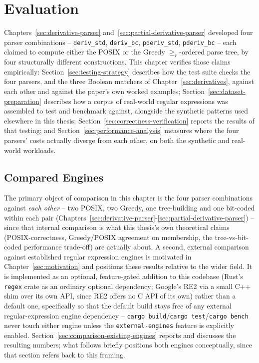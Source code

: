 \chapter{Evaluation}
\label{sec:evaluation}

Chapters~\ref{sec:derivative-parser} and~\ref{sec:partial-derivative-parser}
developed four parser combinations -- \texttt{deriv\_std},
\texttt{deriv\_bc}, \texttt{pderiv\_std}, \texttt{pderiv\_bc} -- each
claimed to compute either the POSIX or the Greedy $\geq_r$-ordered parse
tree, by four structurally different constructions. This chapter
verifies those claims empirically: Section~\ref{sec:testing-strategy}
describes how the test suite checks the four parsers, and the three
Boolean matchers of Chapter~\ref{sec:derivatives}, against each other
and against the paper's own worked examples;
Section~\ref{sec:dataset-preparation} describes how a corpus of
real-world regular expressions was assembled to test and benchmark
against, alongside the synthetic patterns used elsewhere in this
thesis; Section~\ref{sec:correctness-verification} reports the results
of that testing; and Section~\ref{sec:performance-analysis} measures
where the four parsers' costs actually diverge from each other, on both
the synthetic and real-world workloads.



\section{Compared Engines}
\label{sec:compared-engines}

The primary object of comparison in this chapter is the four parser
combinations against \emph{each other} -- two POSIX, two Greedy, one
tree-building and one bit-coded within each pair
(Chapters~\ref{sec:derivative-parser}-\ref{sec:partial-derivative-parser})
-- since that internal comparison is what this thesis's own theoretical
claims (POSIX-correctness, Greedy/POSIX agreement on membership, the
tree-vs-bit-coded performance trade-off) are actually about. A second,
external comparison against established regular expression engines is
motivated in Chapter~\ref{sec:motivation} and positions these results
relative to the wider field. It is implemented as an optional,
feature-gated addition to this codebase (Rust's \texttt{regex} crate as
an ordinary optional dependency; Google's RE2 via a small C++ shim over
its own API, since RE2 offers no C API of its own) rather than a default
one, specifically so that the default build stays free of any external
regular-expression engine dependency -- \texttt{cargo build}/\texttt{cargo
test}/\texttt{cargo bench} never touch either engine unless the
\texttt{external-engines} feature is explicitly enabled.
Section~\ref{sec:comparison-existing-engines} reports and discusses the
resulting numbers; what follows briefly positions both engines
conceptually, since that section refers back to this framing.

